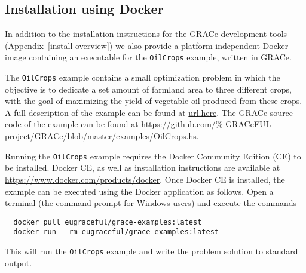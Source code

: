 
\subsection{Installation using Docker}
\label{install-docker}

In addition to the installation instructions for the GRACe development tools
(Appendix~\ref{install-overview}) we also provide a platform-independent Docker
image containing an executable for the \verb!OilCrops! example, written in
GRACe.

The \verb!OilCrops! example contains a small optimization problem in which the
objective is to dedicate a set amount of farmland area to three different crops,
with the goal of maximizing the yield of vegetable oil produced from these 
crops. A full description of the example can be found at \url{url.here}. 
The GRACe source code of the example can be found at \url{https://github.com/%
GRACeFUL-project/GRACe/blob/master/examples/OilCrops.hs}.

Running the \verb!OilCrops! example requires the Docker Community Edition (CE)
to be installed. Docker CE, as well as installation instructions are available
at \url{https://www.docker.com/products/docker}. Once Docker CE is installed,
the example can be executed using the Docker application as follows. Open a
terminal (the command prompt for Windows users) and execute the commands
%
\begin{verbatim}
  docker pull eugraceful/grace-examples:latest
  docker run --rm eugraceful/grace-examples:latest
\end{verbatim}

\noindent
This will run the \verb!OilCrops! example and write the problem solution to
standard output.
